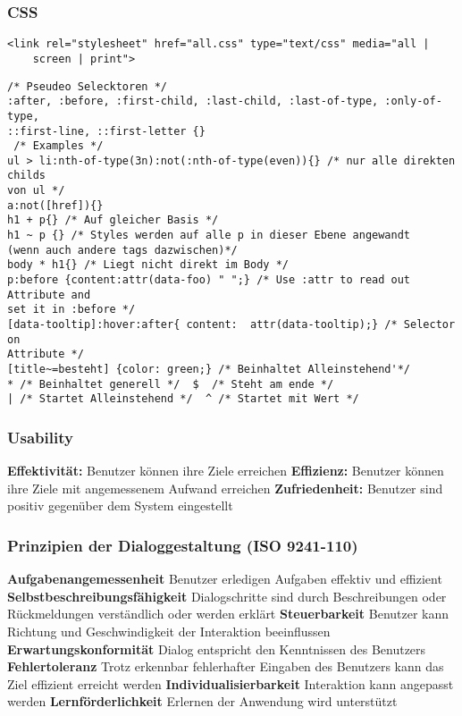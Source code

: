 \begin{multicols*}{4}
\subsubsection{CSS}
 \begin{verbatim}
<link rel="stylesheet" href="all.css" type="text/css" media="all | 
    screen | print">
 \end{verbatim}
 
\begin{verbatim}
/* Pseudeo Selecktoren */
:after, :before, :first-child, :last-child, :last-of-type, :only-of-type,
::first-line, ::first-letter {}
 /* Examples */
ul > li:nth-of-type(3n):not(:nth-of-type(even)){} /* nur alle direkten childs 
von ul */
a:not([href]){}
h1 + p{} /* Auf gleicher Basis */
h1 ~ p {} /* Styles werden auf alle p in dieser Ebene angewandt 
(wenn auch andere tags dazwischen)*/
body * h1{} /* Liegt nicht direkt im Body */
p:before {content:attr(data-foo) " ";} /* Use :attr to read out Attribute and 
set it in :before */
[data-tooltip]:hover:after{ content:  attr(data-tooltip);} /* Selector on 
Attribute */
[title~=besteht] {color: green;} /* Beinhaltet Alleinstehend'*/
* /* Beinhaltet generell */  $  /* Steht am ende */ 
| /* Startet Alleinstehend */  ^ /* Startet mit Wert */

\end{verbatim}

\subsubsection{Usability}
 \textbf{ Effektivität:}
Benutzer können ihre Ziele erreichen
\textbf{ Effizienz: }
Benutzer können ihre Ziele mit angemessenem Aufwand erreichen
\textbf{Zufriedenheit:}
Benutzer sind positiv gegenüber dem System eingestellt

\subsubsection{Prinzipien der Dialoggestaltung (ISO 9241-110)}

\textbf{Aufgabenangemessenheit}
Benutzer erledigen Aufgaben effektiv und effizient
\textbf{Selbstbeschreibungsfähigkeit}
Dialogschritte sind durch Beschreibungen oder Rückmeldungen verständlich oder werden erklärt
\textbf{Steuerbarkeit}
Benutzer kann Richtung und Geschwindigkeit der Interaktion beeinflussen
\textbf{Erwartungskonformität}
Dialog entspricht den Kenntnissen des Benutzers
\textbf{Fehlertoleranz}
Trotz erkennbar fehlerhafter Eingaben des Benutzers kann das Ziel effizient erreicht werden
\textbf{Individualisierbarkeit}
Interaktion kann angepasst werden
\textbf{Lernförderlichkeit}
Erlernen der Anwendung wird unterstützt

\end{multicols*}
